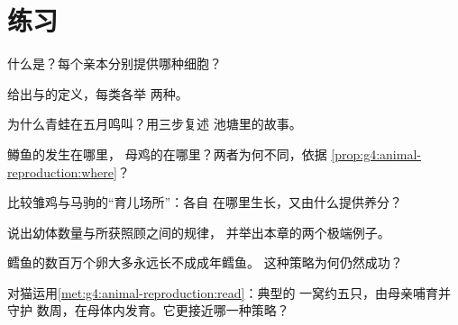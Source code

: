 \section{练习}

\begin{exercise}[$\star$]\label{exo:g4:animal-reproduction:1}
什么是？每个亲本分别提供哪种细胞？
\end{exercise}

\begin{exercise}[$\star$]\label{exo:g4:animal-reproduction:2}
给出与的定义，每类各举
两种。
\end{exercise}

\begin{exercise}[$\star$]\label{exo:g4:animal-reproduction:3}
为什么青蛙在五月鸣叫？用三步复述
池塘里的故事。
\end{exercise}

\begin{exercise}[$\star$]\label{exo:g4:animal-reproduction:4}
鳟鱼的发生在哪里，
母鸡的在哪里？两者为何不同，依据
\cref{prop:g4:animal-reproduction:where}？
\end{exercise}

\begin{exercise}[$\star$]\label{exo:g4:animal-reproduction:5}
比较雏鸡与马驹的“育儿场所”：各自
在哪里生长，又由什么提供养分？
\end{exercise}

\begin{exercise}[$\star$]\label{exo:g4:animal-reproduction:6}
说出幼体数量与所获照顾之间的规律，
并举出本章的两个极端例子。
\end{exercise}

\begin{exercise}[$\star$]\label{exo:g4:animal-reproduction:7}
鳕鱼的数百万个卵大多永远长不成成年鳕鱼。
这种策略为何仍然成功？
\end{exercise}

\begin{exercise}[$\star$]\label{exo:g4:animal-reproduction:8}
对猫运用\cref{met:g4:animal-reproduction:read}：典型的
一窝约五只，由母亲哺育并守护
数周，在母体内发育。它更接近哪一种策略？
\end{exercise}

